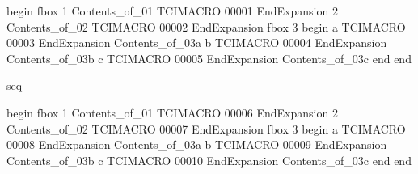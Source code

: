 begin
fbox 1
Contents_of_01
TCIMACRO
00001
EndExpansion
2
Contents_of_02
TCIMACRO
00002
EndExpansion
fbox 3
begin
a
TCIMACRO
00003
EndExpansion
Contents_of_03a
b
TCIMACRO
00004
EndExpansion
Contents_of_03b
c
TCIMACRO
00005
EndExpansion
Contents_of_03c
end
end

seq

begin
fbox 1
Contents_of_01
TCIMACRO
00006
EndExpansion
2
Contents_of_02
TCIMACRO
00007
EndExpansion
fbox 3
begin
a
TCIMACRO
00008
EndExpansion
Contents_of_03a
b
TCIMACRO
00009
EndExpansion
Contents_of_03b
c
TCIMACRO
00010
EndExpansion
Contents_of_03c
end
end

